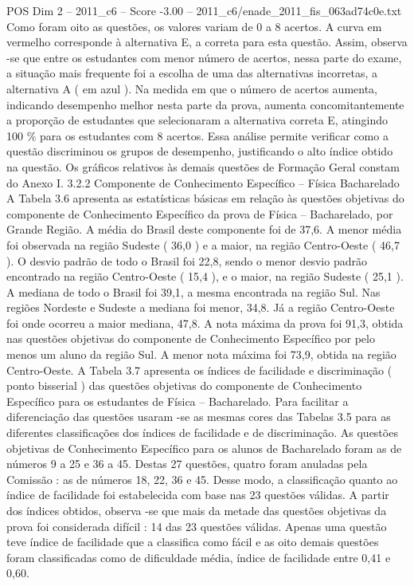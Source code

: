 \begin{textsample}{POS Dim 2 – 2011\_c6 – Score -3.00 – 2011\_c6/enade\_2011\_fis\_063ad74c0e.txt}
Como foram oito as questões, os valores variam de 0 a 8 acertos.
A curva em vermelho corresponde à alternativa E, a correta para esta questão.
Assim, observa -se que entre os estudantes com menor número de acertos, nessa parte do exame, a situação mais frequente foi a escolha de uma das alternativas incorretas, a alternativa A ( em azul ).
Na medida em que o número de acertos aumenta, indicando desempenho melhor nesta parte da prova, aumenta concomitantemente a proporção de estudantes que selecionaram a alternativa correta E, atingindo 100 \% para os estudantes com 8 acertos.
Essa análise permite verificar como a questão discriminou os grupos de desempenho, justificando o alto índice obtido na questão.
Os gráficos relativos às demais questões de Formação Geral constam do Anexo I. 3.2.2 Componente de Conhecimento Específico – Física Bacharelado A Tabela 3.6 apresenta as estatísticas básicas em relação às questões objetivas do componente de Conhecimento Específico da prova de Física – Bacharelado, por Grande Região.
A média do Brasil deste componente foi de 37,6.
A menor média foi observada na região Sudeste ( 36,0 ) e a maior, na região Centro-Oeste ( 46,7 ).
O desvio padrão de todo o Brasil foi 22,8, sendo o menor desvio padrão encontrado na região Centro-Oeste ( 15,4 ), e o maior, na região Sudeste ( 25,1 ).
A mediana de todo o Brasil foi 39,1, a mesma encontrada na região Sul.
Nas regiões Nordeste e Sudeste a mediana foi menor, 34,8.
Já a região Centro-Oeste foi onde ocorreu a maior mediana, 47,8.
A nota máxima da prova foi 91,3, obtida nas questões objetivas do componente de Conhecimento Específico por pelo menos um aluno da região Sul.
A menor nota máxima foi 73,9, obtida na região Centro-Oeste.
A Tabela 3.7 apresenta os índices de facilidade e discriminação ( ponto bisserial ) das questões objetivas do componente de Conhecimento Específico para os estudantes de Física – Bacharelado.
Para facilitar a diferenciação das questões usaram -se as mesmas cores das Tabelas 3.5 para as diferentes classificações dos índices de facilidade e de discriminação.
As questões objetivas de Conhecimento Específico para os alunos de Bacharelado foram as de números 9 a 25 e 36 a 45.
Destas 27 questões, quatro foram anuladas pela Comissão : as de números 18, 22, 36 e 45.
Desse modo, a classificação quanto ao índice de facilidade foi estabelecida com base nas 23 questões válidas.
A partir dos índices obtidos, observa -se que mais da metade das questões objetivas da prova foi considerada difícil : 14 das 23 questões válidas.
Apenas uma questão teve índice de facilidade que a classifica como fácil e as oito demais questões foram classificadas como de dificuldade média, índice de facilidade entre 0,41 e 0,60.

\end{textsample}
